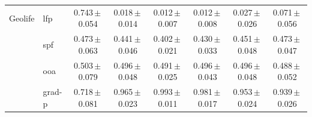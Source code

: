 \begin{table}[t]
\begin{tabular}{llcccccc}
\midrule
Geolife & lfp & 0.743\,$\pm$\,0.054 & 0.018\,$\pm$\,0.014 & 0.012\,$\pm$\,0.007 & 0.012\,$\pm$\,0.008 & 0.027\,$\pm$\,0.026 & 0.071\,$\pm$\,0.056 \\
 & spf & 0.473\,$\pm$\,0.063 & 0.441\,$\pm$\,0.046 & 0.402\,$\pm$\,0.021 & 0.430\,$\pm$\,0.033 & 0.451\,$\pm$\,0.048 & 0.473\,$\pm$\,0.047 \\
 & ooa & 0.503\,$\pm$\,0.079 & 0.496\,$\pm$\,0.048 & 0.491\,$\pm$\,0.025 & 0.496\,$\pm$\,0.043 & 0.496\,$\pm$\,0.048 & 0.488\,$\pm$\,0.052 \\
 & grad-p & 0.718\,$\pm$\,0.081 & 0.965\,$\pm$\,0.023 & 0.993\,$\pm$\,0.011 & 0.981\,$\pm$\,0.017 & 0.953\,$\pm$\,0.024 & 0.939\,$\pm$\,0.026 \\
\midrule
\bottomrule
\end{tabular}
\end{table}
